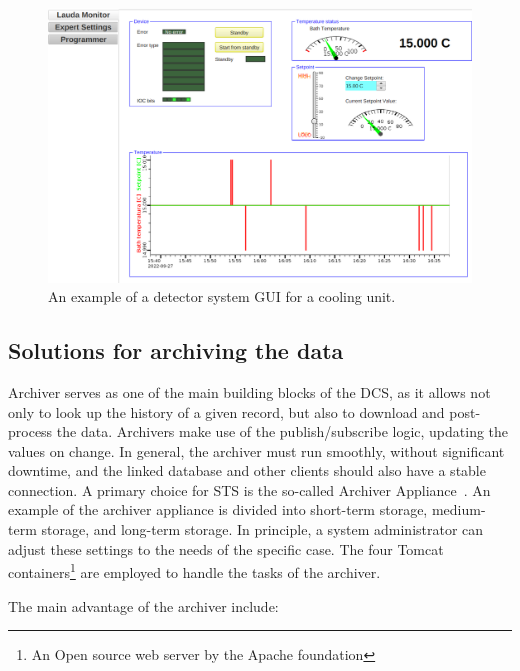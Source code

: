 \begin{figure}[!h]
\centering
\includegraphics[width=1\columnwidth]{Chapter4/images/lauda1.png}
\caption{An example of a detector system \gls{GUI} for a cooling unit.}
\label{fig_lauda1}
\end{figure}

\subsection{Solutions for archiving the data} \label{archiver}
Archiver serves as one of the main building blocks of the \gls{DCS}, as it allows not only to look up the history of a given record, but also to download and post-process the data. Archivers make use of the publish/subscribe logic, updating the values on change. In general, the archiver must run smoothly, without significant downtime, and the linked database and other clients should also have a stable connection. A primary choice for \gls{STS} is the so-called Archiver Appliance~\cite{archiver_appliance}. An example of the archiver appliance is divided into short-term storage, medium-term storage, and long-term storage. In principle, a system administrator can adjust these settings to the needs of the specific case. The  four Tomcat containers\footnote{An Open source web server by the Apache foundation} are employed to handle the tasks of the archiver.  

The main advantage of the archiver include: 

